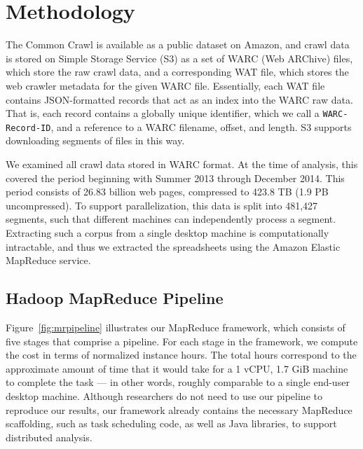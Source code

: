 \documentclass[conference]{IEEEtran}
\begin{document}
\section{Methodology}



The Common Crawl is available as a public dataset on Amazon, and crawl data is stored on Simple Storage Service (S3) as a set of WARC (Web ARChive) files, which store the raw crawl data, and a corresponding WAT file, which stores the web crawler metadata for the given WARC file. Essentially, each WAT file contains JSON-formatted records that act as an index into the WARC raw data. That is, each record contains a globally unique identifier, which we call a \texttt{WARC-Record-ID}, and a reference to a WARC filename, offset, and length. S3 supports downloading segments of files in this way.

We examined all crawl data stored in WARC format. At the time of analysis, this covered the period beginning with Summer 2013 through December 2014. This period consists of 26.83 billion web pages, compressed to 423.8 TB (1.9 PB uncompressed). To support parallelization, this data is split into 481,427 segments, such that different machines can independently process a segment. Extracting such a corpus from a single desktop machine is computationally intractable, and thus we extracted the spreadsheets using the Amazon Elastic MapReduce service.


 

\subsection{Hadoop MapReduce Pipeline}

Figure~\ref{fig:mrpipeline} illustrates our MapReduce framework, which consists of five stages that comprise a pipeline. For each stage in the framework, we compute the cost in terms of normalized instance hours. The total hours correspond to the approximate amount of time that it would take for a 1 vCPU, 1.7 GiB machine to complete the task --- in other words, roughly comparable to a single end-user desktop machine.  Although researchers do not need to use our pipeline to reproduce our results, our framework already contains the necessary MapReduce scaffolding, such as task scheduling code, as well as Java libraries, to support distributed analysis.
\end{document}
